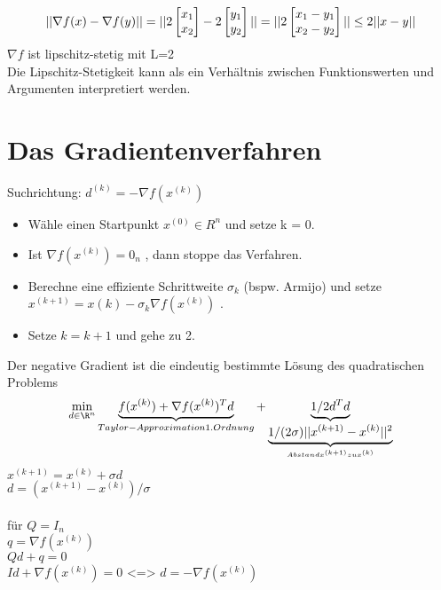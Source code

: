 \begin{equation}
|| \nabla f(x) - \nabla f(y) || = || 2 \begin{bmatrix}x_1\\x_2\end{bmatrix} -2 \begin{bmatrix}y_1\\y_2\end{bmatrix} ||\\
= ||2 \begin{bmatrix}x_1 -y_1\\x_2 - y_2\end{bmatrix} ||\\
\leq 2 ||x-y||
\end{equation}
$\nabla f$ ist lipschitz-stetig mit L=2\\
Die Lipschitz-Stetigkeit kann als ein Verhältnis zwischen Funktionswerten und Argumenten interpretiert werden.

\section{Das Gradientenverfahren}

Suchrichtung: $d^{(k)} = -\nabla f(x^{(k)})$
\begin{itemize}
	\item Wähle einen Startpunkt $x^{(0)} \in R^n$ und setze k = 0.
	\item Ist $\nabla f(x^{(k)}) = 0_n$ , dann stoppe das Verfahren.
	\item Berechne eine effiziente Schrittweite $\sigma_k$ (bspw. Armijo) und setze
	$x^{(k+1)} = x{(k)} - \sigma_k \nabla f(x^{(k)})$ .
	\item Setze $k = k + 1$ und gehe zu 2.
\end{itemize}
Der negative Gradient ist die eindeutig bestimmte Lösung des quadratischen Problems
\begin{equation}
	\min_{d\in\R^n} \underbrace{f(x^{(k)}) + \nabla f(x^{(k)})^Td}_{Taylor-Approximation 1. Ordnung} + \underbrace{1/2 d^Td}_{\underbrace{1/(2\sigma)||x^{(k+1)} - x^{(k)}||^2}_{Abstand  x^{(k+1)} zu  x^{(k)}}}
\end{equation}
$x^{(k+1)} = x^{(k)} + \sigma d$\\
$d = (x^{(k+1)}-x^{(k)})/\sigma$
\\
\\	
für $Q=I_n$\\
$q = \nabla f(x^{(k)})$\\
$Qd + q = 0$\\
$Id + \nabla f(x^{(k)}) = 0$   <=> $d=-\nabla f(x^{(k)})$

